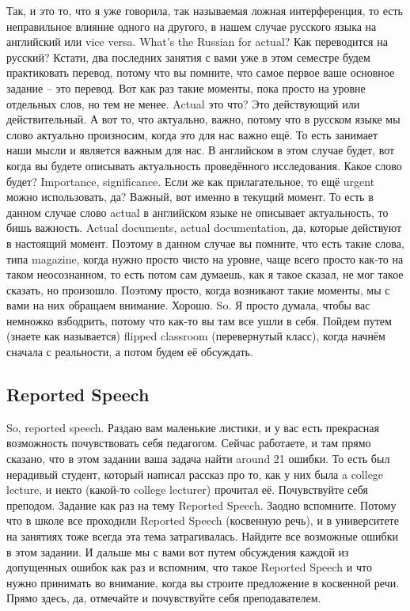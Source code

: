 \documentclass[main.tex]{subfiles}
\begin{document}
Так, и это то, что я уже говорила, так называемая ложная интерференция, то есть неправильное влияние одного на другого, в нашем случае русского языка на английский или vice versa.
What's the Russian for actual?
Как переводится на русский?
Кстати, два последних занятия с вами уже в этом семестре будем практиковать перевод, потому что вы помните, что самое первое ваше основное задание -- это перевод.
Вот как раз такие моменты, пока просто на уровне отдельных слов, но тем не менее.
Actual это что?
Это действующий или действительный.
А вот то, что актуально, важно, потому что в русском языке мы слово актуально произносим, когда это для нас важно ещё.
То есть занимает наши мысли и является важным для нас.
В английском в этом случае будет, вот когда вы будете описывать актуальность проведённого исследования.
Какое слово будет?
Importance, significance.
Если же как прилагательное, то ещё urgent можно использовать, да?
Важный, вот именно в текущий момент.
То есть в данном случае слово actual в английском языке не описывает актуальность, то бишь важность.
Actual documents, actual documentation, да, которые действуют в настоящий момент.
Поэтому в данном случае вы помните, что есть такие слова, типа magazine, когда нужно просто чисто на уровне, чаще всего просто как-то на таком неосознанном, то есть потом сам думаешь, как я такое сказал, не мог такое сказать, но произошло.
Поэтому просто, когда возникают такие моменты, мы с вами на них обращаем внимание.
Хорошо.
So.
Я просто думала, чтобы вас немножко взбодрить, потому что как-то вы там все ушли в себя.
Пойдем путем (знаете как называется) flipped classroom (перевернутый класс), когда начнём сначала с реальности, а потом будем её обсуждать.

\subsection{Reported Speech}

So, reported speech.
Раздаю вам маленькие листики, и у вас есть прекрасная возможность почувствовать себя педагогом.
Сейчас работаете, и там прямо сказано, что в этом задании ваша задача найти around 21 ошибки.
То есть был нерадивый студент, который написал рассказ про то, как у них была a college lecture, и некто (какой-то college lecturer) прочитал её.
Почувствуйте себя преподом.
Задание как раз на тему Reported Speech.
Заодно вспомните.
Потому что в школе все проходили Reported Speech (косвенную речь), и в университете на занятиях тоже всегда эта тема затрагивалась.
Найдите все возможные ошибки в этом задании.
И дальше мы с вами вот путем обсуждения каждой из допущенных ошибок как раз и вспомним, что такое Reported Speech и что нужно принимать во внимание, когда вы строите предложение в косвенной речи.
Прямо здесь, да, отмечайте и почувствуйте себя преподавателем.
\\
\end{document}
